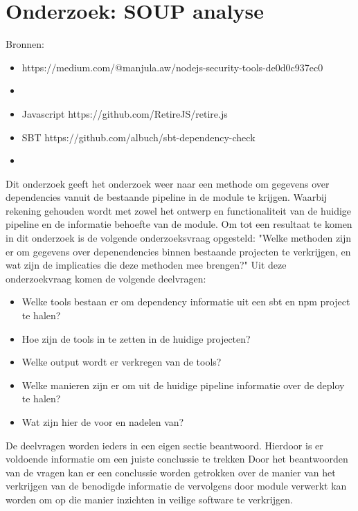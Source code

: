 \chapter{Onderzoek: SOUP analyse}\label{ch:onderzoek:-soup-analyse} %
Bronnen:

\begin{itemize}
    \item https://medium.com/@manjula.aw/nodejs-security-tools-de0d0c937ec0
    \item
\end{itemize}
\begin{itemize}
    \item Javascript     https://github.com/RetireJS/retire.js
    \item SBT https://github.com/albuch/sbt-dependency-check
    \item
\end{itemize}
Dit onderzoek geeft het onderzoek weer naar een methode om gegevens over dependencies vanuit de bestaande pipeline in de module te krijgen. Waarbij rekening gehouden wordt met zowel het ontwerp en functionaliteit van de huidige pipeline en de informatie behoefte van de module. Om tot een resultaat te komen in dit onderzoek is de volgende onderzoeksvraag opgesteld: "Welke methoden zijn er om gegevens over depenendencies binnen bestaande projecten te verkrijgen, en wat zijn de implicaties die deze methoden mee brengen?" Uit deze onderzoekvraag komen de volgende deelvragen:
\begin{itemize}
    \item Welke tools bestaan er om dependency informatie uit een sbt en npm project te halen?
    \item Hoe zijn de tools in te zetten in de huidige projecten?
    \item Welke output wordt er verkregen van de tools?
    \item Welke manieren zijn er om uit de huidige pipeline informatie over de deploy te halen?
    \item Wat zijn hier de voor en nadelen van?
\end{itemize}
De deelvragen worden ieders in een eigen sectie beantwoord. Hierdoor is er voldoende informatie om een juiste conclussie te trekken
Door het beantwoorden van de vragen kan er een conclussie worden getrokken over de manier van het verkrijgen van de benodigde informatie de vervolgens door module verwerkt kan worden om op die manier inzichten in veilige software te verkrijgen.



